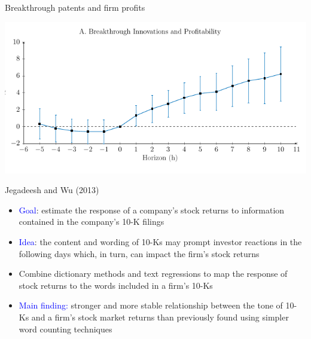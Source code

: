 \documentclass[english]{beamer}
\begin{document}
\begin{frame}{Breakthrough patents and firm profits}
\begin{center}
\includegraphics[width=1\textwidth]{Images/kelly-6}
\par\end{center}
\end{frame}

\begin{frame}{Jegadeesh and Wu (2013)}
\begin{itemize}
\setlength{\itemsep}{1.5em}
\item \textcolor{blue}{Goal}: estimate the response of a company's stock returns to information contained in the company's 10-K filings
\item \textcolor{blue}{Idea}: the content and wording of 10-Ks may prompt investor reactions in the following days which, in turn, can impact the firm's stock returns
\item Combine dictionary methods and text regressions to map the response of stock returns to the words included in a firm's 10-Ks


\item \textcolor{blue}{Main finding:} stronger and more stable relationship between the tone of 10-Ks and a firm's stock market returns than previously found using simpler word counting techniques
\end{itemize}
\end{frame}
\end{document}
